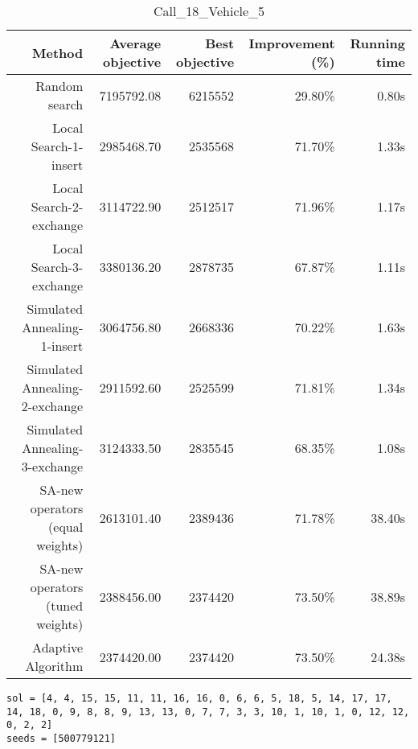 \begin{table}[ht]
\centering
\caption{Call\_18\_Vehicle\_5}
\label{tab:call18vehicle5}
\begin{tabular}{|r|r|r|r|r|}
Method & Average objective & Best objective & Improvement (\%) & Running time \\
\hline
Random search & 7195792.08 & 6215552 & 29.80\% & 0.80s\\
Local Search-1-insert & 2985468.70 & 2535568 & 71.70\% & 1.33s\\
Local Search-2-exchange & 3114722.90 & 2512517 & 71.96\% & 1.17s\\
Local Search-3-exchange & 3380136.20 & 2878735 & 67.87\% & 1.11s\\
Simulated Annealing-1-insert & 3064756.80 & 2668336 & 70.22\% & 1.63s\\
Simulated Annealing-2-exchange & 2911592.60 & 2525599 & 71.81\% & 1.34s\\
Simulated Annealing-3-exchange & 3124333.50 & 2835545 & 68.35\% & 1.08s\\
SA-new operators (equal weights) & 2613101.40 & 2389436 & 71.78\% & 38.40s\\
SA-new operators (tuned weights) & 2388456.00 & 2374420 & 73.50\% & 38.89s\\
Adaptive Algorithm & 2374420.00 & 2374420 & 73.50\% & 24.38s\\
\end{tabular}%
\end{table}
\begin{lstlisting}[label={lst:call18vehicle5},caption=Optimal solution call\_18\_vehicle\_5]
sol = [4, 4, 15, 15, 11, 11, 16, 16, 0, 6, 6, 5, 18, 5, 14, 17, 17, 14, 18, 0, 9, 8, 8, 9, 13, 13, 0, 7, 7, 3, 3, 10, 1, 10, 1, 0, 12, 12, 0, 2, 2]
seeds = [500779121]
\end{lstlisting}%
\clearpage


